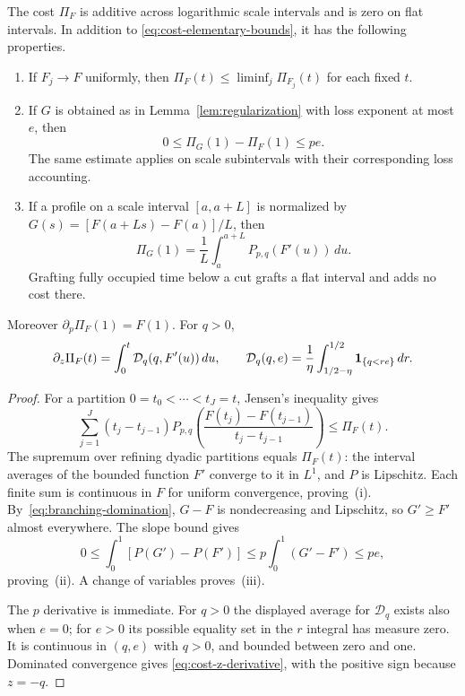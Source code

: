 \begin{lemma}\label{lem:profile-cost}
The cost $\Pi_F$ is additive across logarithmic scale intervals and is
zero on flat intervals. In addition to \eqref{eq:cost-elementary-bounds},
it has the following properties.
\begin{enumerate}[label=(\roman*)]
\item If $F_j\to F$ uniformly, then
$\Pi_F(t)\le\liminf_j\Pi_{F_j}(t)$ for each fixed $t$.
\item If $G$ is obtained as in Lemma~\ref{lem:regularization} with loss
exponent at most $e$, then
\[
 0\le\Pi_G(1)-\Pi_F(1)\le pe.
\]
The same estimate applies on scale subintervals with their corresponding
loss accounting.
\item If a profile on a scale interval $[a,a+L]$ is normalized by
$G(s)=[F(a+Ls)-F(a)]/L$, then
\[
 \Pi_G(1)=\frac1L\int_a^{a+L}P_{p,q}(F'(u))\,du.
\]
Grafting fully occupied time below a cut grafts a flat interval and adds no
cost there.
\end{enumerate}
Moreover $\partial_p\Pi_F(1)=F(1)$.  For $q>0$,
\begin{equation}\label{eq:cost-z-derivative}
 \partial_z\Pi_F(t)=\int_0^t\mathcal D_q(q,F'(u))\,du,
 \qquad
 \mathcal D_q(q,e)=\frac1\eta\int_{1/2-\eta}^{1/2}
                  \mathbf 1_{\{q<re\}}\,dr.
\end{equation}
\end{lemma}

\begin{proof}
For a partition $0=t_0<\cdots<t_J=t$, Jensen's inequality gives
\[
 \sum_{j=1}^J(t_j-t_{j-1})
 P_{p,q}\!\left(\frac{F(t_j)-F(t_{j-1})}{t_j-t_{j-1}}\right)
 \le\Pi_F(t).
\]
The supremum over refining dyadic partitions equals $\Pi_F(t)$: the
interval averages of the bounded function $F'$ converge to it in $L^1$,
and $P$ is Lipschitz.  Each finite sum is continuous in $F$ for uniform
convergence, proving~(i).  By~\eqref{eq:branching-domination}, $G-F$ is
nondecreasing and Lipschitz, so $G'\ge F'$ almost everywhere.  The slope
bound gives
\[
 0\le\int_0^1[P(G')-P(F')]\le
 p\int_0^1(G'-F')\le pe,
\]
proving~(ii).  A change of variables proves~(iii).

The $p$ derivative is immediate.  For $q>0$ the displayed average for
$\mathcal D_q$ exists also when $e=0$; for $e>0$ its possible equality set
in the $r$ integral has measure zero.  It is continuous in $(q,e)$ with
$q>0$, and bounded between zero and one.  Dominated convergence gives
\eqref{eq:cost-z-derivative}, with the positive sign because $z=-q$.
\end{proof}

